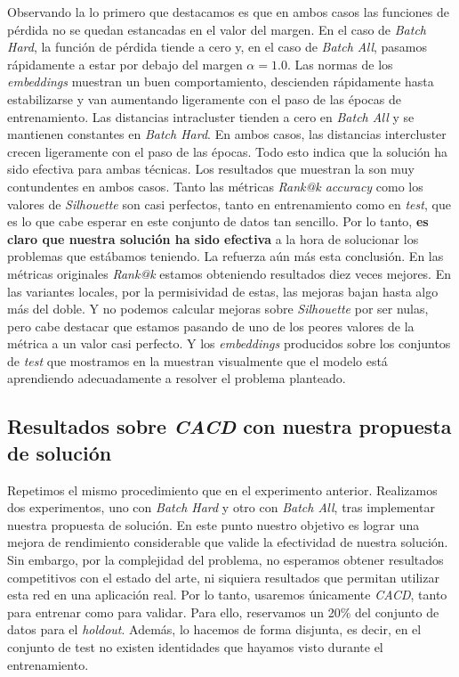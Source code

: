 Observando la  lo primero que destacamos es que en ambos casos las funciones de pérdida no se quedan estancadas en el valor del margen. En el caso de \textit{Batch Hard}, la función de pérdida tiende a cero y, en el caso de \textit{Batch All}, pasamos rápidamente a estar por debajo del margen $\alpha = 1.0$. Las normas de los \textit{embeddings} muestran un buen comportamiento, descienden rápidamente hasta estabilizarse y van aumentando ligeramente con el paso de las épocas de entrenamiento. Las distancias intracluster tienden a cero en \textit{Batch All} y se mantienen constantes en \textit{Batch Hard}. En ambos casos, las distancias intercluster crecen ligeramente con el paso de las épocas. Todo esto indica que la solución ha sido efectiva para ambas técnicas. Los resultados que muestran la  son muy contundentes en ambos casos. Tanto las métricas \textit{Rank@k accuracy} como los valores de \textit{Silhouette} son casi perfectos, tanto en entrenamiento como en \textit{test}, que es lo que cabe esperar en este conjunto de datos tan sencillo. Por lo tanto, \textbf{es claro que nuestra solución ha sido efectiva} a la hora de solucionar los problemas que estábamos teniendo. La  refuerza aún más esta conclusión. En las métricas originales \textit{Rank@k} estamos obteniendo resultados diez veces mejores. En las variantes locales, por la permisividad de estas, las mejoras bajan hasta algo más del doble. Y no podemos calcular mejoras sobre \textit{Silhouette} por ser nulas, pero cabe destacar que estamos pasando de uno de los peores valores de la métrica a un valor casi perfecto. Y los \textit{embeddings} producidos sobre los conjuntos de \textit{test} que mostramos en la  muestran visualmente que el modelo está aprendiendo adecuadamente a resolver el problema planteado.

\subsection{Resultados sobre \textit{CACD} con nuestra propuesta de solución} \label{isubsec:experimentacion_cacd_bien}

Repetimos el mismo procedimiento que en el experimento anterior. Realizamos dos experimentos, uno con \textit{Batch Hard} y otro con \textit{Batch All}, tras implementar nuestra propuesta de solución. En este punto nuestro objetivo es lograr una mejora de rendimiento considerable que valide la efectividad de nuestra solución. Sin embargo, por la complejidad del problema, no esperamos obtener resultados competitivos con el estado del arte, ni siquiera resultados que permitan utilizar esta red en una aplicación real. Por lo tanto, usaremos únicamente \textit{CACD}, tanto para entrenar como para validar. Para ello, reservamos un 20\% del conjunto de datos para el \textit{holdout}. Además, lo hacemos de forma disjunta, es decir, en el conjunto de test no existen identidades que hayamos visto durante el entrenamiento.

